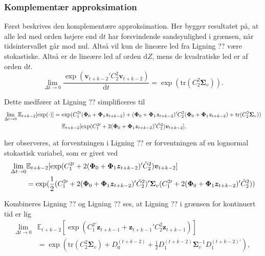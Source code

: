 \documentclass[
  a4paper,
  oneside]{memoir}
\begin{document}
\hypertarget{komplementuxe6r-approksimation}{%
\subsubsection{Komplementær approksimation}\label{komplementuxe6r-approksimation}}

Først beskrives den komplementære approksimation. Her bygger resultatet på, at alle led med orden højere end \(\text{d}t\) har forsvindende sandsynlighed i grænsen, når tidsintervallet går mod nul. Altså vil kun de lineære led fra Ligning ?? være stokastiske. Altså er de lineære led af orden \(\text{d}Z\), mens de kvadratiske led er af orden \(\text{d}t\).
\[\lim_{\Delta t \to 0}\frac{\exp( \bm{v}_{t+k-2}' C_2^2 \bm{v}_{t+k-2} )}{\text{d}t}=\exp( \text{tr}(C_2^2 \bm{\Sigma}_v) ).\]

Dette medfører at Ligning ?? simplificeres til
\begin{align*}
\lim_{\Delta t \to 0}\mathbb{E}_{t+k-2}[\exp(\cdot)] &=\exp( C_1^{2\prime} (\bm{\Phi}_0+\bm{\Phi}_1\bm{z}_{t+k-2} ) + (\bm{\Phi}_0+\bm{\Phi}_1\bm{z}_{t+k-2} )' C_2^2 (\bm{\Phi}_0+\bm{\Phi}_1\bm{z}_{t+k-2}) +  \text{tr}(C_2^2 \bm{\Sigma}_v))\\
                                &\,\,\quad \mathbb{E}_{t+k-2}[ \exp( C_1^{2\prime} + 2(\bm{\Phi}_0+\bm{\Phi}_1\bm{z}_{t+k-2})' \Tilde{C}_2^{2} )   \bm{v}_{t+k-2}],
\end{align*}

her observeres, at forventningen i Ligning ?? er forventningen af en lognormal stokastisk variabel, som er givet ved
\begin{align*}
\lim_{\Delta t \to 0}&\mathbb{E}_{t+k-2}[ \exp( C_1^{2\prime} + 2(\bm{\Phi}_0+\bm{\Phi}_1\bm{z}_{t+k-2})' \Tilde{C}_2^{2} )   \bm{v}_{t+k-2}]\\
&=\exp(\frac{1}{2} (C_1^{2\prime} + 2(\bm{\Phi}_0+\bm{\Phi}_1\bm{z}_{t+k-2})' \Tilde{C}_2^{2})' \bm{\Sigma}_v (C_1^{2\prime} + 2(\bm{\Phi}_0+\bm{\Phi}_1\bm{z}_{t+k-2})' \Tilde{C}_2^{2})) 
\end{align*}

Kombineres Ligning ?? og Ligning ?? ses, at Ligning ?? i grænsen for kontinuert tid er lig
\begin{align*}
\lim_{\Delta t \to 0} &\mathbb{E}_{t+k-2}[ \exp( C_1^{2\prime} \bm{z}_{t+k-1} + \bm{z}_{t+k-1}' C_2^2 \bm{z}_{t+k-1} )]\\
                      &=\exp( \text{tr}(C_2^2\bm{\Sigma}_v) + D_0^{(t+k-2)} + \frac{1}{2} D_1^{(t+k-2)} \bm{\Sigma}_v^{-1} D_1^{(t+k-2)'} ),
\end{align*}
\end{document}
